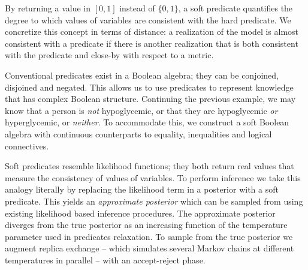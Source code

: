 By returning a value in $[0, 1]$ instead of $\{0, 1\}$, a soft predicate quantifies the degree to which values of variables are consistent with the hard predicate.
We concretize this concept in terms of distance: a realization of the model is almost consistent with a predicate if there is another realization that is both consistent with the predicate and close-by with respect to a metric.

Conventional predicates exist in a Boolean algebra; they can be conjoined, disjoined and negated.
This allows us to use predicates to represent knowledge that has complex Boolean structure.
Continuing the previous example, we may know that a person is \emph{not} hypoglycemic, or that they are hypoglycemic \emph{or} hyperglycemic, or \emph{neither}.
To accommodate this, we construct a soft Boolean algebra with continuous counterparts to equality, inequalities and logical connectives.

Soft predicates resemble likelihood functions; they both return real values that measure the consistency of values of variables.
To perform inference we take this analogy literally by replacing the likelihood term in a posterior with a soft predicate.
This yields an \emph{approximate posterior} which can be sampled from using existing likelihood based inference procedures.
The approximate posterior diverges from the true posterior as an increasing function of the temperature parameter used in predicates relaxation.
To sample from the true posterior we augment replica exchange -- which simulates several Markov chains at different temperatures in parallel -- with an accept-reject phase. 





